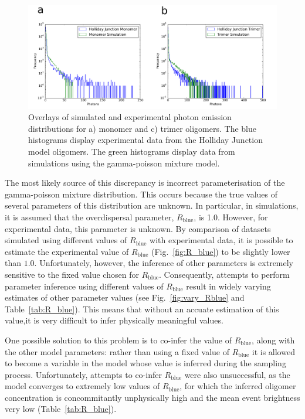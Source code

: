 \begin{figure}
   \begin{center}
      \includegraphics*[clip=true, width=6.5in]{sizing/HJ_overlays.pdf}
      \caption{Overlays of simulated and experimental photon emission distributions for a) monomer and c) trimer oligomers. The blue histograms display experimental data from the Holliday Junction model oligomers. The green histograms display data from simulations using the gamma-poisson mixture model.}
      \label{fig:HJ_sim_overlay}
   \end{center}
\end{figure}

The most likely source of this discrepancy is incorrect parameterisation of the gamma-poisson mixture distribution. This occurs because the true values of several parameters of this distribution are unknown. In particular, in simulations, it is assumed that the overdispersal parameter, $R_{\text{blue}}$, is 1.0. However, for experimental data, this parameter is unknown. By comparison of datasets simulated using different values of $R_{\text{blue}}$ with experimental data, it is possible to estimate the experimental value of $R_{\text{blue}}$ (Fig.~\ref{fig:R_blue}) to be slightly lower than $1.0$. Unfortunately, however, the inference of other parameters is extremely sensitive to the fixed value chosen for $R_{\text{blue}}$. Consequently, attempts to perform parameter inference using different values of $R_{\text{blue}}$ result in widely varying estimates of other parameter values (see Fig.~\ref{fig:vary_Rblue} and Table~\ref{tab:R_blue}). This means that without an accuate estimation of this value,it is very difficult to infer physically meaningful values.

One possible solution to this problem is to co-infer the value of $R_{\text{blue}}$, along with the other model parameters: rather than using a fixed value of $R_{\text{blue}}$ it is allowed to become a variable in the model whose value is inferred during the sampling process. Unfortunately, attempts to co-infer $R_{\text{blue}}$ were also unsuccessful, as the model converges to extremely low values of $R_{\text{blue}}$, for which the inferred oligomer concentration is concommitantly unphysically high and the mean event brightness very low (Table~\ref{tab:R_blue}). 

